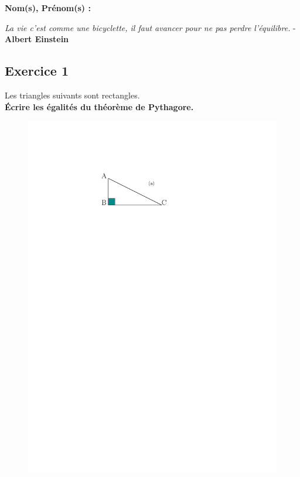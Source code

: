 \documentclass[12pt]{article}
\begin{document}

\textbf{Nom(s), Prénom(s) :}

\begin{center}
\textit{La vie c'est comme une bicyclette, il faut avancer pour ne pas perdre l'équilibre.} - \textbf{Albert Einstein}
\end{center}

\begin{multicols}{3}

  \subsection*{Exercice 1}
  Les triangles suivants sont rectangles.\\
  \textbf{Écrire les égalités du théorème de Pythagore.}

  \begin{figure}[H]
    \centering
    \includegraphics[width=0.7\linewidth]{sources/1/exo1-tri-1a.pdf}
  \end{figure}


\end{multicols}
\end{document}
